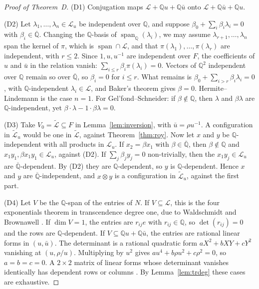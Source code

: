 \documentclass[11pt,a4paper]{article}
\theoremstyle{plain}
\theoremstyle{definition}
\newcommand{\Q}{\mathbb{Q}}
\newcommand{\Qbar}{\overline{\mathbb{Q}}}
\newcommand{\cL}{\mathcal{L}}
\newcommand{\Lt}{\widetilde{\mathcal{L}}}
\newcommand{\spn}{\operatorname{span}}
\begin{document}
\begin{proof}[Proof of Theorem~D]
(D1) Conjugation maps $\cL+\Q u+\Q\bar u$ onto $\cL+\Q\bar u+\Q u$.

(D2) Let $\lambda_{1},\dots,\lambda_{n}\in\cL_{u}$ be independent over $\Q$, and suppose
$\beta_{0}+\sum_{i}\beta_{i}\lambda_{i}=0$ with $\beta_{i}\in\Qbar$. Changing the $\Q$-basis of
$\spn_{\Q}(\lambda_{i})$, we may assume $\lambda_{r+1},\dots,\lambda_{n}$ span the kernel of
$\pi$, which is $\spn\cap\cL$, and that $\pi(\lambda_{1}),\dots,\pi(\lambda_{r})$ are
independent, with $r\le2$. Since $1,u,u^{-1}$ are independent over $F$, the coefficients
of $u$ and $\bar u$ in the relation vanish: $\sum_{i\le r}\beta_{i}\pi(\lambda_{i})=0$. Vectors
of $\Q^{2}$ independent over $\Q$ remain so over $\Qbar$, so $\beta_{i}=0$ for $i\le r$.
What remains is $\beta_{0}+\sum_{i>r}\beta_{i}\lambda_{i}=0$, with $\Q$-independent
$\lambda_{i}\in\cL$, and Baker's theorem \cite{Bak66} gives $\beta=0$. Hermite--Lindemann
is the case $n=1$. For Gel'fond--Schneider: if $\beta\notin\Q$, then $\lambda$ and
$\beta\lambda$ are $\Q$-independent, yet $\beta\cdot\lambda-1\cdot\beta\lambda=0$.

(D3) Take $V_{0}=\Lt\subseteq F$ in Lemma~\ref{lem:inversion}, with $\bar u=\rho u^{-1}$. A
configuration in $\Lt_{u}$ would be one in $\Lt$, against Theorem~\ref{thm:roy}. Now let
$x$ and $y$ be $\Q$-independent with all products in $\cL_{u}$. If $x_{2}=\beta x_{1}$ with
$\beta\in\Qbar$, then $\beta\notin\Q$ and $x_{1}y_{1},\beta x_{1}y_{1}\in\cL_{u}$, against
(D2). If $\sum_{j}\beta_{j}y_{j}=0$ non-trivially, then the $x_{1}y_{j}\in\cL_{u}$ are
$\Qbar$-dependent. By (D2) they are $\Q$-dependent, so $y$ is $\Q$-dependent. Hence
$x$ and $y$ are $\Qbar$-independent, and $x\otimes y$ is a configuration in $\Lt_{u}$,
against the first part.

(D4) Let $V$ be the $\Q$-span of the entries of $N$. If $V\subseteq\cL$, this is the four
exponentials theorem in transcendence degree one, due to Waldschmidt and Brownawell
\cite[Thm.~6.31]{BP}. If $\dim V=1$, the entries are $r_{ij}e$ with $r_{ij}\in\Q$, so
$\det(r_{ij})=0$ and the rows are $\Q$-dependent. If $V\subseteq\Q u+\Q\bar u$, the entries
are rational linear forms in $(u,\bar u)$. The determinant is a rational quadratic form
$aX^{2}+bXY+cY^{2}$ vanishing at $(u,\rho/u)$. Multiplying by $u^{2}$ gives
$au^{4}+b\rho u^{2}+c\rho^{2}=0$, so $a=b=c=0$. A $2\times2$ matrix of linear forms whose
determinant vanishes identically has dependent rows or columns \cite[Lemma~12.1]{BP}.
By Lemma~\ref{lem:trdeg} these cases are exhaustive.
\end{proof}
\end{document}

